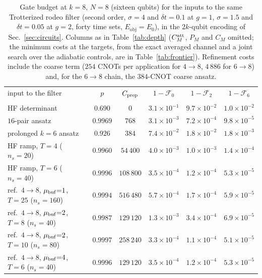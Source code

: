 \documentclass[
  aps,            %
  prc,            %
  reprint,        %
  superscriptaddress,
  floatfix,
  nofootinbib
]{revtex4-2}
\newcommand{\Eobj}{E_{\mathrm{obj}}}
\begin{document}
\begin{table}[t]
\caption{\label{tab:largebudget}Gate budget at $k=8$, $N=8$ (sixteen
qubits) for the inputs to the same Trotterized rodeo filter (second order,
$\sigma=4$ and $\delta t=0.1$ at $g=1$, $\sigma=1.5$ and $\delta t=0.05$ at
$g=2$, forty time sets, $\Eobj=E_0$), in the $2k$-qubit encoding of
Sec.~\ref{sec:circuits}.  Columns as in Table~\ref{tab:depth} ($C^{\rm att}_M$, $P_M$ and $C_M$
omitted; the minimum costs at the targets, from the exact averaged channel
and a joint search over the adiabatic controls, are in
Table~\ref{tab:frontier}).  Refinement costs include the coarse term
($254$ CNOTs per application for $4\to8$, $4\,886$ for $6\to8$) and, for the
$6\to8$ chain, the $384$-CNOT coarse ansatz.}
\scriptsize
\begin{ruledtabular}
\begin{tabular}{lcc ccc}
input to the filter & $p$ & $C_{\rm prep}$ & $1-\mathcal F_0$ & $1-\mathcal F_2$ & $1-\mathcal F_6$\\
\colrule
\multicolumn{6}{l}{$g=1$ ($E_0=8.88917$, cycle $1.2\times10^{5}$ CNOTs)}\\
HF determinant & $0.690$ & $0$ & $3.1\times10^{-1}$ & $9.7\times10^{-2}$ & $1.0\times10^{-2}$\\
$16$-pair ansatz & $0.9969$ & $768$ & $3.1\times10^{-3}$ & $7.2\times10^{-4}$ & $9.8\times10^{-5}$\\
prolonged $k{=}6$ ansatz & $0.926$ & $384$ & $7.4\times10^{-2}$ & $1.8\times10^{-2}$ & $1.8\times10^{-3}$\\
HF ramp, $T{=}4$ ($n_s{=}20$) & $0.9960$ & $54\,400$ & $4.0\times10^{-3}$ & $1.0\times10^{-3}$ & $1.4\times10^{-4}$\\
HF ramp, $T{=}6$ ($n_s{=}40$) & $0.9996$ & $108\,800$ & $3.5\times10^{-4}$ & $1.2\times10^{-4}$ & $5.3\times10^{-5}$\\
ref.\ $4{\to}8$, $\mu_{\rm buf}{=}1$, $T{=}25$ ($n_s{=}160$) & $0.9994$ & $516\,480$ & $5.7\times10^{-4}$ & $1.7\times10^{-4}$ & $5.9\times10^{-5}$\\
ref.\ $4{\to}8$, $\mu_{\rm buf}{=}2$, $T{=}8$ ($n_s{=}40$) & $0.9987$ & $129\,120$ & $1.3\times10^{-3}$ & $3.4\times10^{-4}$ & $6.9\times10^{-5}$\\
ref.\ $4{\to}8$, $\mu_{\rm buf}{=}2$, $T{=}10$ ($n_s{=}80$) & $0.9997$ & $258\,240$ & $3.3\times10^{-4}$ & $1.1\times10^{-4}$ & $5.1\times10^{-5}$\\
ref.\ $4{\to}8$, $\mu_{\rm buf}{=}4$, $T{=}6$ ($n_s{=}40$) & $0.9996$ & $129\,120$ & $3.5\times10^{-4}$ & $1.2\times10^{-4}$ & $5.3\times10^{-5}$\\

\end{tabular}
\end{ruledtabular}
\end{table}
\end{document}
